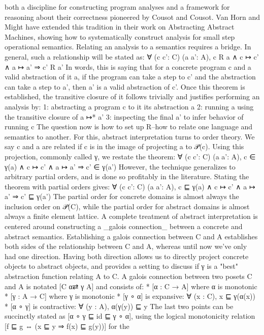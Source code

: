 \documentclass{article}
\begin{document}
both a discipline for constructing program analyses
and a framework for reasoning about their correctness pioneered by Cousot and
Cousot. Van Horn and Might have extended this tradition in their work on
Abstracting Abstract Machines, showing how to systematically construct analysis
for small step operational semantics.
%
Relating an analysis to a semantics requires a bridge.  In general, such a
relationship will be stated as:
%
∀ (c c': C) (a a': A), c R a ∧ c ↦ c' ∧ a ↦ a' ⇒  c' R a'
%
In words, this is saying that for a concrete program c and a valid abstraction
of it a, if the program can take a step to c' and the abstraction can take a
step to a', then a' is a valid abstraction of c'.
%
Once this theorem is established, the transitive closure of it follows
trivially and justifies performing an analysis by:
%
1: abstracting a program c to it its abstraction a
2: running a using the transitive closure of a ↦* a'
3: inspecting the final a' to infer behavior of running c
%
The question now is how to set up R--how to relate one language and semantics
to another. For this, abstract interpretation turns to order theory.  We say c
and a are related if c is in the image of projecting a to 𝒫(c).  Using this
projection, commonly called γ, we restate the theorem:
%
∀ (c c': C) (a a': A), c ∈ γ(a) ∧ c ↦ c' ∧ a ↦ a' ⇒  c' ∈ γ(a')
%
However, the technique generalizes to arbitrary partial orders, and is done so
profitably in the literature.  Stating the theorem with partial orders gives:
%
∀ (c c': C) (a a': A), c ⊑ γ(a) ∧ c ↦ c' ∧ a ↦ a' ⇒  c' ⊑ γ(a')
%
The partial order for concrete domains is almost always the inclusion order on
𝒫(C), while the partial order for abstract domains is almost always a finite
element lattice.
%
A complete treatment of abstract interpretation is centered around constructing
a _galois connection_ between a concrete and abstract semantics. Establishing a
galois connection between C and A establishes both sides of the relationship
between C and A, whereas until now we've only had one direction.
Having both direction allows us to directly project concrete objects to
abstract objects, and provides a setting to discuss if γ is a "best"
abstraction function relating A to C.
%
A galois connection between two posets C and A is notated [C α⇄ γ A] and
consists of:
%
* [α : C → A] where α is monotonic
* [γ : A → C] where γ is monotonic
* [γ ∘ α] is expansive: ∀ (x : C), x ⊑ γ(α(x))
* [α ∘ γ] is contractive: ∀ (y : A), α(γ(y)) ⊑ y
%
The last two points can be succinctly stated as [α ∘ γ ⊑ id ⊑ γ ∘ α], using the
logical monotonicity relation [f ⊑ g ⇔  (x ⊑ y ⇒  f(x) ⊑ g(y))] for the
\end{document}
